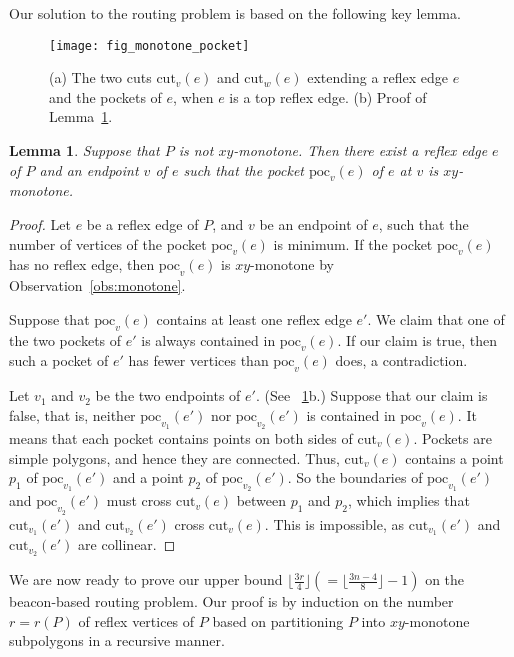 \documentclass[11pt]{article}
\newcommand{\cut}{\ensuremath{\mathrm{cut}}}
\newcommand{\poc}{\ensuremath{\mathrm{poc}}}
\newtheorem{lemma}{Lemma}
\theoremstyle{definition}
\begin{document}
Our solution to the routing problem is based on the following key lemma.

\begin{figure}[tb]
\centering
\texttt{[image: fig\_monotone\_pocket]}
\caption{(a) The two cuts $\cut_v(e)$ and $\cut_w(e)$ extending a reflex edge $e$
and the pockets of $e$, when $e$ is a top reflex edge.
(b) Proof of Lemma~\ref{lem:monotone_pocket}.
\label{fig:monotone_pocket}}
\end{figure}


\begin{lemma} \label{lem:monotone_pocket}
 Suppose that $P$ is not $xy$-monotone.
 Then there exist a reflex edge $e$ of $P$ and an endpoint $v$ of $e$ such that
 the pocket $\poc_v(e)$ of $e$ at $v$ is $xy$-monotone. 
\end{lemma}
\begin{proof} 
Let $e$ be a reflex edge of $P$, and $v$ be an endpoint of $e$, such that
the number of vertices of the pocket $\poc_v(e)$ is minimum.
If the pocket $\poc_v(e)$ has no reflex edge, then
$\poc_v(e)$ is $xy$-monotone by Observation~\ref{obs:monotone}.

Suppose that $\poc_v(e)$ contains at least one reflex edge $e'$.
We claim that one of the two pockets of $e'$ is always contained in $\poc_v(e)$.
If our claim is true, then such a pocket of $e'$ has fewer vertices
than $\poc_v(e)$ does, a contradiction.

Let $v_1$ and $v_2$ be the two endpoints of $e'$. (See \figurename~\ref{fig:monotone_pocket}b.)
Suppose that our claim is false,
that is, neither $\poc_{v_1}(e')$ nor $\poc_{v_2}(e')$  is contained in $\poc_v(e)$.
It means that each pocket contains points on both sides of  $\cut_v(e)$.
Pockets are simple polygons, and hence they are connected. Thus, $\cut_v(e)$ contains
a point $p_1$ of $\poc_{v_1}(e')$ and a point $p_2$ of $\poc_{v_2}(e')$. So the boundaries
of  $\poc_{v_1}(e')$ and $\poc_{v_2}(e')$ must cross $\cut_v(e)$ between $p_1$ and $p_2$,
which implies that $\cut_{v_1}(e')$ and $\cut_{v_2}(e')$ cross $\cut_v(e)$. This
is impossible, as  $\cut_{v_1}(e')$ and $\cut_{v_2}(e')$ are
collinear.
\end{proof}

We are now ready to prove our upper bound $\lfloor \frac{3r}{4}\rfloor (=\lfloor \frac{3n-4}{8}\rfloor-1)$
on the beacon-based routing problem.
Our proof is by induction on the number $r = r(P)$ of reflex vertices of $P$
based on partitioning $P$ into $xy$-monotone subpolygons in a recursive manner. 
\end{document}
